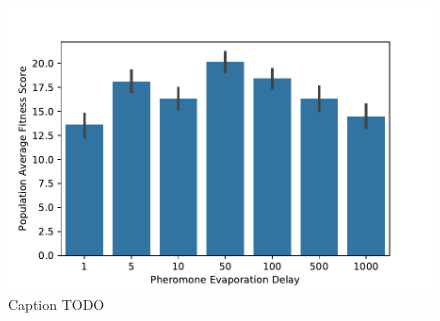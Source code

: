 \begin{figure}[!htbp]
\begin{center}
\includegraphics[width=\textwidth]{img/pheromone_evaporation_delay_average_fitness.pdf}
\caption{
Caption TODO
}
\label{fig:pheromone_evaporation_delay_average_fitness}
\end{center}
\end{figure}
